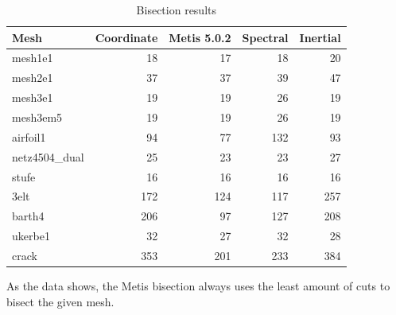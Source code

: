 \documentclass[unicode,11pt,a4paper,oneside,numbers=endperiod,openany]{scrartcl}
\begin{document}
\begin{table}[H]
\caption{Bisection results}
\centering
\small
\begin{tabular}{l|r|r|r|r} \hline\hline 
Mesh             &  Coordinate           & Metis 5.0.2  & Spectral & Inertial  \\ \hline
mesh1e1          &   18          &       17      &      18    &       20    \\             
mesh2e1          &   37          &      37       &    39      &     47      \\ 
mesh3e1   &              19      &     19      &      26    &       19    \\ 
mesh3em5   &          19          &       19      &    26      &   19        \\ 
airfoil1   &            94        &     77        &     132     &      93     \\ 
netz4504\_dual   &         25            &       23      &    23      &    27       \\ 
stufe            &              16          &      16       &      16    &      16     \\ 
3elt            &           172             &    124         &     117     &     257      \\ 
barth4           &             206           &       97      &   127       &     208      \\ 
ukerbe1         &               32         &      27       &  32        &     28      \\ 
crack            &            353           &       201      &    233      &    384       \\ 
\hline \hline
\end{tabular}
\label{table:bisection}
\end{table}


As the data shows, the Metis bisection always uses the least amount of cuts to bisect the given mesh.
\end{document}

